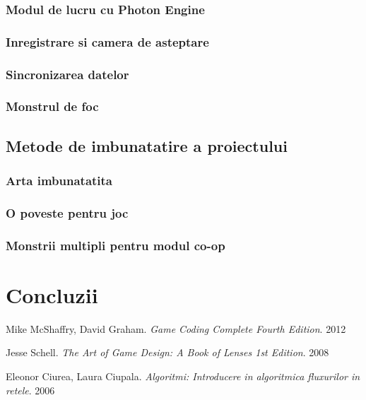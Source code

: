 \documentclass[12pt, a4paper]{article}
\begin{document}
	\subsubsection{Modul de lucru cu Photon Engine}
	
	\subsubsection{Inregistrare si camera de asteptare}
	
	\subsubsection{Sincronizarea datelor}
	
	\subsubsection{Monstrul de foc}
	
	\subsection{Metode de imbunatatire a proiectului}
	
	\subsubsection{Arta imbunatatita}
	
	\subsubsection{O poveste pentru joc}
	
	\subsubsection{Monstrii multipli pentru modul co-op}
	
	\section{Concluzii}
	
	
	\pagebreak
	\begin{thebibliography}{3}
		Mike McShaffry, David Graham. \newline
		\textit{Game Coding Complete Fourth Edition}. 2012
		
		Jesse Schell.  \newline
		\textit{The Art of Game Design: A Book of Lenses 1st Edition}. 2008
		
		Eleonor Ciurea, Laura Ciupala.  \newline
		\textit{Algoritmi: Introducere in algoritmica fluxurilor in retele}. 2006
		
	\end{thebibliography}
	
	
\end{document}
